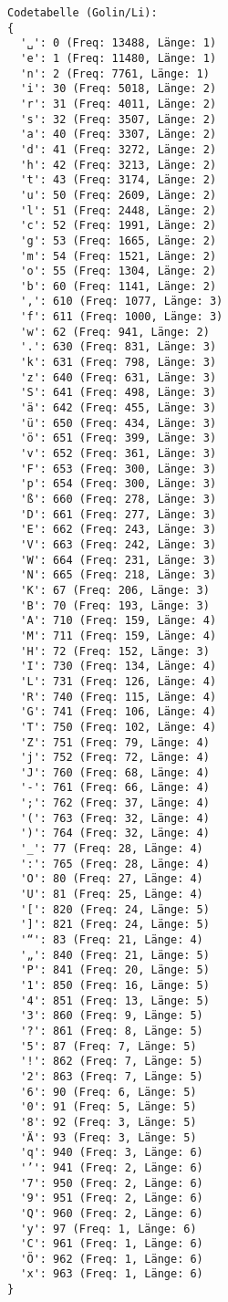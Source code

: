 \documentclass[a4paper,10pt,ngerman]{scrartcl}
\begin{document}
\begin{enumerate}
\begin{verbatim}
Codetabelle (Golin/Li):
{
  '␣': 0 (Freq: 13488, Länge: 1)
  'e': 1 (Freq: 11480, Länge: 1)
  'n': 2 (Freq: 7761, Länge: 1)
  'i': 30 (Freq: 5018, Länge: 2)
  'r': 31 (Freq: 4011, Länge: 2)
  's': 32 (Freq: 3507, Länge: 2)
  'a': 40 (Freq: 3307, Länge: 2)
  'd': 41 (Freq: 3272, Länge: 2)
  'h': 42 (Freq: 3213, Länge: 2)
  't': 43 (Freq: 3174, Länge: 2)
  'u': 50 (Freq: 2609, Länge: 2)
  'l': 51 (Freq: 2448, Länge: 2)
  'c': 52 (Freq: 1991, Länge: 2)
  'g': 53 (Freq: 1665, Länge: 2)
  'm': 54 (Freq: 1521, Länge: 2)
  'o': 55 (Freq: 1304, Länge: 2)
  'b': 60 (Freq: 1141, Länge: 2)
  ',': 610 (Freq: 1077, Länge: 3)
  'f': 611 (Freq: 1000, Länge: 3)
  'w': 62 (Freq: 941, Länge: 2)
  '.': 630 (Freq: 831, Länge: 3)
  'k': 631 (Freq: 798, Länge: 3)
  'z': 640 (Freq: 631, Länge: 3)
  'S': 641 (Freq: 498, Länge: 3)
  'ä': 642 (Freq: 455, Länge: 3)
  'ü': 650 (Freq: 434, Länge: 3)
  'ö': 651 (Freq: 399, Länge: 3)
  'v': 652 (Freq: 361, Länge: 3)
  'F': 653 (Freq: 300, Länge: 3)
  'p': 654 (Freq: 300, Länge: 3)
  'ß': 660 (Freq: 278, Länge: 3)
  'D': 661 (Freq: 277, Länge: 3)
  'E': 662 (Freq: 243, Länge: 3)
  'V': 663 (Freq: 242, Länge: 3)
  'W': 664 (Freq: 231, Länge: 3)
  'N': 665 (Freq: 218, Länge: 3)
  'K': 67 (Freq: 206, Länge: 3)
  'B': 70 (Freq: 193, Länge: 3)
  'A': 710 (Freq: 159, Länge: 4)
  'M': 711 (Freq: 159, Länge: 4)
  'H': 72 (Freq: 152, Länge: 3)
  'I': 730 (Freq: 134, Länge: 4)
  'L': 731 (Freq: 126, Länge: 4)
  'R': 740 (Freq: 115, Länge: 4)
  'G': 741 (Freq: 106, Länge: 4)
  'T': 750 (Freq: 102, Länge: 4)
  'Z': 751 (Freq: 79, Länge: 4)
  'j': 752 (Freq: 72, Länge: 4)
  'J': 760 (Freq: 68, Länge: 4)
  '-': 761 (Freq: 66, Länge: 4)
  ';': 762 (Freq: 37, Länge: 4)
  '(': 763 (Freq: 32, Länge: 4)
  ')': 764 (Freq: 32, Länge: 4)
  '_': 77 (Freq: 28, Länge: 4)
  ':': 765 (Freq: 28, Länge: 4)
  'O': 80 (Freq: 27, Länge: 4)
  'U': 81 (Freq: 25, Länge: 4)
  '[': 820 (Freq: 24, Länge: 5)
  ']': 821 (Freq: 24, Länge: 5)
  '“': 83 (Freq: 21, Länge: 4)
  '„': 840 (Freq: 21, Länge: 5)
  'P': 841 (Freq: 20, Länge: 5)
  '1': 850 (Freq: 16, Länge: 5)
  '4': 851 (Freq: 13, Länge: 5)
  '3': 860 (Freq: 9, Länge: 5)
  '?': 861 (Freq: 8, Länge: 5)
  '5': 87 (Freq: 7, Länge: 5)
  '!': 862 (Freq: 7, Länge: 5)
  '2': 863 (Freq: 7, Länge: 5)
  '6': 90 (Freq: 6, Länge: 5)
  '0': 91 (Freq: 5, Länge: 5)
  '8': 92 (Freq: 3, Länge: 5)
  'Ä': 93 (Freq: 3, Länge: 5)
  'q': 940 (Freq: 3, Länge: 6)
  '’': 941 (Freq: 2, Länge: 6)
  '7': 950 (Freq: 2, Länge: 6)
  '9': 951 (Freq: 2, Länge: 6)
  'Q': 960 (Freq: 2, Länge: 6)
  'y': 97 (Freq: 1, Länge: 6)
  'C': 961 (Freq: 1, Länge: 6)
  'Ö': 962 (Freq: 1, Länge: 6)
  'x': 963 (Freq: 1, Länge: 6)
}


\end{verbatim}
\end{enumerate}
\end{document}
